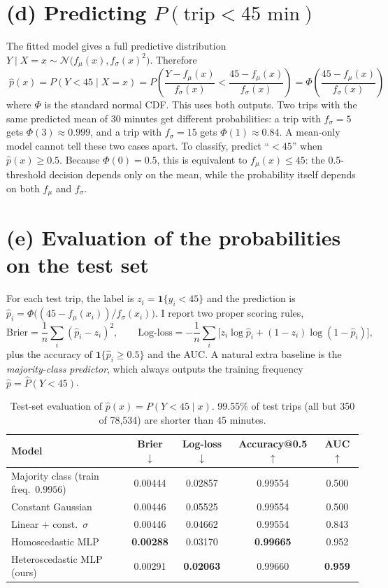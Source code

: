 \documentclass[11pt]{article}
\begin{document}
\section*{(d) Predicting $P(\text{trip} < 45\text{ min})$}

The fitted model gives a full predictive distribution
$Y\mid X=x\sim\mathcal N\bigl(f_\mu(x), f_\sigma(x)^2\bigr)$. Therefore
\[
 \boxed{\;
 \hat p(x) = P(Y<45\mid X=x)
   = P\!\left(\frac{Y-f_\mu(x)}{f_\sigma(x)} < \frac{45-f_\mu(x)}{f_\sigma(x)}\right)
   = \Phi\!\left(\frac{45-f_\mu(x)}{f_\sigma(x)}\right)\;}
\]
where $\Phi$ is the standard normal CDF. This uses both outputs. Two trips with the same predicted
mean of 30 minutes get different probabilities: a trip with $f_\sigma=5$ gets
$\Phi(3)\approx0.999$, and a trip with $f_\sigma=15$ gets $\Phi(1)\approx0.84$. A mean-only model
cannot tell these two cases apart. To classify, predict ``$<45$'' when $\hat p(x)\ge 0.5$. Because
$\Phi(0)=0.5$, this is equivalent to $f_\mu(x)\le45$: the 0.5-threshold decision depends only on
the mean, while the probability itself depends on both $f_\mu$ and $f_\sigma$.

\section*{(e) Evaluation of the probabilities on the test set}

For each test trip, the label is $z_i=\mathbf 1\{y_i<45\}$ and the prediction is
$\hat p_i=\Phi\bigl((45-f_\mu(x_i))/f_\sigma(x_i)\bigr)$. I report two proper scoring rules,
\[
 \text{Brier}=\frac1n\sum_i(\hat p_i-z_i)^2,\qquad
 \text{Log-loss}=-\frac1n\sum_i\bigl[z_i\log\hat p_i+(1-z_i)\log(1-\hat p_i)\bigr],
\]
plus the accuracy of $\mathbf 1\{\hat p_i\ge0.5\}$ and the AUC. A natural extra baseline is the
\emph{majority-class predictor}, which always outputs the training frequency
$\hat p=\hat P(Y<45)$.

\begin{table}[H]\centering
\begin{tabular}{lcccc}
\toprule
Model & Brier $\downarrow$ & Log-loss $\downarrow$ & Accuracy@0.5 $\uparrow$ & AUC $\uparrow$\\
\midrule
Majority class (train freq.\ $0.9956$) & 0.00444 & 0.02857 & 0.99554 & 0.500 \\
Constant Gaussian                      & 0.00446 & 0.05525 & 0.99554 & 0.500 \\
Linear + const.\ $\sigma$              & 0.00446 & 0.04662 & 0.99554 & 0.843 \\
Homoscedastic MLP                      & \textbf{0.00288} & 0.03170 & \textbf{0.99665} & 0.952 \\
Heteroscedastic MLP (ours)             & 0.00291 & \textbf{0.02063} & 0.99660 & \textbf{0.959} \\
\bottomrule
\end{tabular}
\caption{Test-set evaluation of $\hat p(x)=P(Y<45\mid x)$. 99.55\% of test trips (all but 350 of
78{,}534) are shorter than 45 minutes.}
\end{table}
\end{document}
